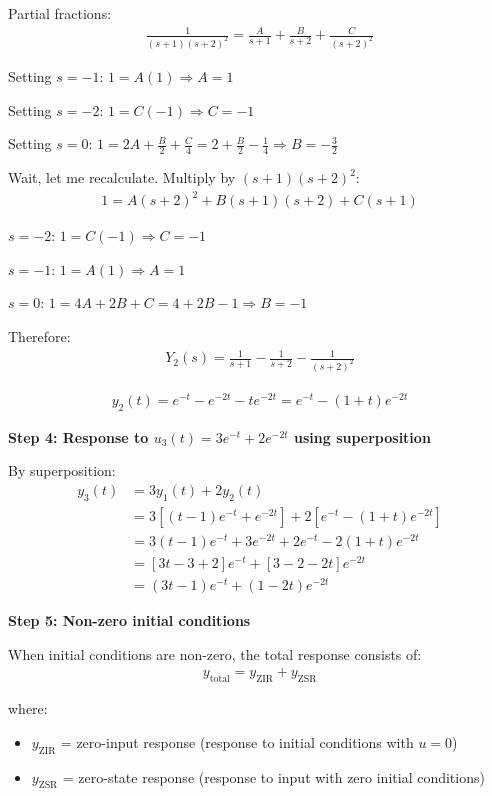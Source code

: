 \documentclass[11pt,a4paper]{article}
\begin{document}
Partial fractions:
\begin{align}
\frac{1}{(s+1)(s+2)^2} = \frac{A}{s+1} + \frac{B}{s+2} + \frac{C}{(s+2)^2}
\end{align}

Setting $s = -1$: $1 = A(1) \Rightarrow A = 1$

Setting $s = -2$: $1 = C(-1) \Rightarrow C = -1$

Setting $s = 0$: $1 = 2A + \frac{B}{2} + \frac{C}{4} = 2 + \frac{B}{2} - \frac{1}{4} \Rightarrow B = -\frac{3}{2}$

Wait, let me recalculate. Multiply by $(s+1)(s+2)^2$:
\begin{align}
1 = A(s+2)^2 + B(s+1)(s+2) + C(s+1)
\end{align}

$s = -2$: $1 = C(-1) \Rightarrow C = -1$

$s = -1$: $1 = A(1) \Rightarrow A = 1$

$s = 0$: $1 = 4A + 2B + C = 4 + 2B - 1 \Rightarrow B = -1$

Therefore:
\begin{align}
Y_2(s) = \frac{1}{s+1} - \frac{1}{s+2} - \frac{1}{(s+2)^2}
\end{align}

\begin{align}
y_2(t) = e^{-t} - e^{-2t} - te^{-2t} = e^{-t} - (1+t)e^{-2t}
\end{align}

\textbf{Step 4: Response to $u_3(t) = 3e^{-t} + 2e^{-2t}$ using superposition}

By superposition:
\begin{align}
y_3(t) &= 3y_1(t) + 2y_2(t) \\
&= 3[(t-1)e^{-t} + e^{-2t}] + 2[e^{-t} - (1+t)e^{-2t}] \\
&= 3(t-1)e^{-t} + 3e^{-2t} + 2e^{-t} - 2(1+t)e^{-2t} \\
&= [3t - 3 + 2]e^{-t} + [3 - 2 - 2t]e^{-2t} \\
&= (3t - 1)e^{-t} + (1 - 2t)e^{-2t}
\end{align}

\textbf{Step 5: Non-zero initial conditions}

When initial conditions are non-zero, the total response consists of:
\begin{align}
y_{\text{total}} = y_{\text{ZIR}} + y_{\text{ZSR}}
\end{align}

where:
\begin{itemize}
\item $y_{\text{ZIR}}$ = zero-input response (response to initial conditions with $u = 0$)
\item $y_{\text{ZSR}}$ = zero-state response (response to input with zero initial conditions)
\end{itemize}
\end{document}
